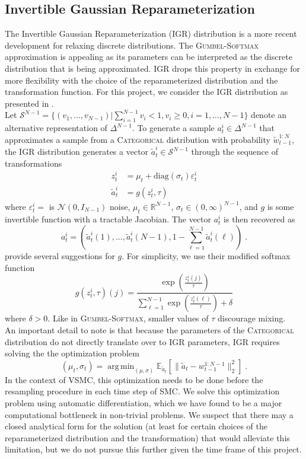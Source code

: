\documentclass[12pt]{article}
\newcommand{\vsmc}{\textsc{VSMC}\xspace}
\newcommand{\smc}{\textsc{SMC}\xspace}
\newcommand{\categorical}{\textsc{Categorical}\xspace}
\newcommand{\gumbelsoftmax}{\textsc{Gumbel-Softmax}\xspace}
\newcommand{\igr}{\textsc{IGR}\xspace}
\DeclareMathOperator*{\argmin}{arg\,min}
\begin{document}
\subsection{Invertible Gaussian Reparameterization}

The Invertible Gaussian Reparameterization \parencite{Potapczynski:2020} (\igr) distribution is a more recent development for relaxing discrete distributions. The \gumbelsoftmax approximation is appealing as its parameters can be interpreted as the discrete distribution that is being approximated. \igr drops this property in exchange for more flexibility with the choice of the reparameterized distribution and the transformation function. For this project, we consider the \igr distribution as presented in \parencite{Potapczynski:2020}.
\\

Let $\mathcal{S}^{N-1}=\{(v_1,...,v_{N-1})|\sum_{i=1}^{N-1}v_i<1,v_i\geq0, i=1,...,N-1\}$ denote an alternative representation of $\Delta^{N-1}$.
To generate a sample $a_t^i\in\Delta^{N-1}$ that approximates a sample from a \categorical distribution with probability $\tilde{w}_{t-1}^{1:N}$, the \igr distribution generates a vector $\tilde{a}_t^i\in\mathcal{S}^{N-1}$ through the sequence of transformations
\begin{align*}
z_t^i &= \mu_t + \mathrm{diag}(\sigma_t)\varepsilon_t^i \\
\tilde{a}_t^i &= g(z_t^i,\tau)
\end{align*}
where $\varepsilon_t^i=$ is $\mathcal{N}(0,I_{N-1})$ noise, $\mu_t\in\mathbb{R}^{N-1}$, $\sigma_t\in (0,\infty)^{N-1}$, and $g$ is some invertible function with a tractable Jacobian. The vector $a_t^i$ is then recovered as
\[
a_t^i = \left(\tilde{a}_t^i(1), \ldots, \tilde{a}_t^i(N-1), 1-\sum_{\ell=1}^{N-1}\tilde{a}_t^i(\ell)\right) \;.
\]
\textcite{Potapczynski:2020} provide several suggestions for $g$. For simplicity, we use their modified softmax function
\[
g(z_t^i,\tau)(j) = \frac{\exp\left(\frac{z_t^i(j)}{\tau}\right)}{\sum_{\ell=1}^{N-1}\exp\left(\frac{z_t^i(\ell)}{\tau}\right)+\delta}
\]
where $\delta>0$. Like in \gumbelsoftmax, smaller values of $\tau$ discourage mixing.
\\

An important detail to note is that because the parameters of the \categorical distribution do not directly translate over to \igr parameters, \igr requires solving the the optimization problem
\[
(\mu_t,\sigma_t) = \argmin_{(\mu,\sigma)}\mathbb{E}_{\tilde{a}_t}\left[\|\tilde{a}_t-w_{t-1}^{1:N-1}\|_2^2\right] \;.
\]
In the context of \vsmc, this optimization needs to be done before the resampling procedure in each time step of \smc. We solve this optimization problem using automatic differentiation, which we have found to be a major computational bottleneck in non-trivial problems. We suspect that there may a closed analytical form for the solution (at least for certain choices of the reparameterized distribution and the transformation) that would alleviate this limitation, but we do not pursue this further given the time frame of this project.
\end{document}
